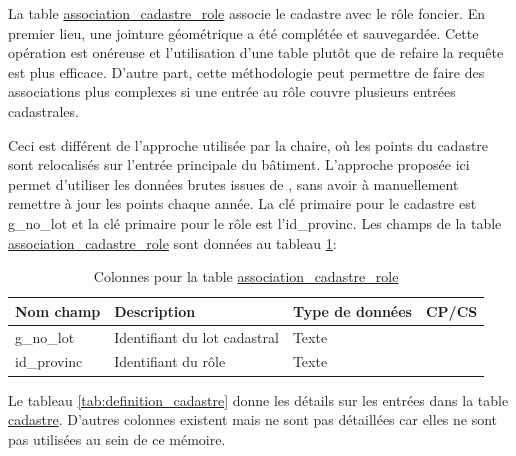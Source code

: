         La table \underline{association\_cadastre\_role} associe le cadastre avec le rôle foncier. En premier lieu, une jointure géométrique a été complétée et sauvegardée. Cette opération est onéreuse et l'utilisation d'une table plutôt que de refaire la requête est plus efficace. D'autre part, cette méthodologie peut permettre de faire des associations plus complexes si une entrée au rôle couvre plusieurs entrées cadastrales. \par
        Ceci est différent de l'approche utilisée par la chaire, où les points du cadastre sont relocalisés sur l'entrée principale du bâtiment. L'approche proposée ici permet d'utiliser les données brutes issues de \textcite{gouvernement_du_quebec_manuel_2024}, sans avoir à manuellement remettre à jour les points chaque année. La clé primaire pour le cadastre est g\_no\_lot et la clé primaire pour le rôle est l'id\_provinc. Les champs de la table \underline{association\_cadastre\_role} sont données au tableau \ref{tab:definition_assoc_role_cadastre}:
        \begin{table}[h]
           \centering
           \begin{tabular}{m{}|m{}m{}m{}}
                \hline
                Nom champ & Description & Type de données & CP/CS  \\
                \hline
                g\_no\_lot & Identifiant du lot cadastral & Texte & \\
                id\_provinc & Identifiant du rôle & Texte & \\
                \hline
           \end{tabular}
           \caption{Colonnes pour la table \underline{association\_cadastre\_role}}
           \label{tab:definition_assoc_role_cadastre}
        \end{table}   
        \par
        Le tableau \ref{tab:definition_cadastre} donne les détails sur les entrées dans la table \underline{cadastre}. D'autres colonnes existent mais ne sont pas détaillées car elles ne sont pas utilisées au sein de ce mémoire.\par
